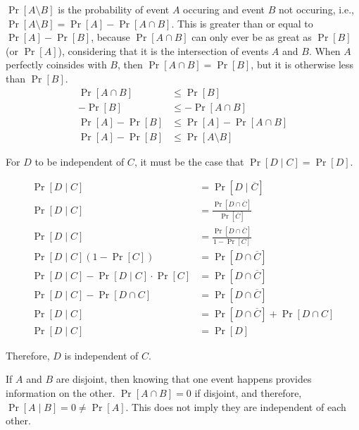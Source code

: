 \documentclass[11pt]{article}
\begin{document}
\begin{solution}

\begin{Parts}

\Part $\Pr[A \setminus B]$ is the probability of event $A$ occuring and event 
$B$ not occuring, i.e., $\Pr[A \setminus B] = \Pr[A] - \Pr[A \cap B]$. This is 
greater than or equal to $\Pr[A] - \Pr[B]$, because $\Pr[A \cap B]$ can
only ever be as great as $\Pr[B]$ (or $\Pr[A]$), considering that it is
the intersection of events $A$ and $B$. When $A$ perfectly coinsides with $B$, 
then $\Pr[A \cap B] = \Pr[B]$, but it is otherwise less than $\Pr[B]$.
\[
    \begin{split}
        \Pr[A \cap B] &\leq \Pr[B] \\
        -\Pr[B] &\leq -\Pr[A \cap B] \\
        \Pr[A] - \Pr[B] &\leq \Pr[A] -\Pr[A \cap B] \\
        \Pr[A] - \Pr[B] &\leq \Pr[A \setminus B] 
    \end{split}
\]

\Part For $D$ to be independent of $C$, it must be the case that $\Pr[D \mid C]
= \Pr[D]$. 

\[
    \begin{split}
        \Pr[D \mid C] &= \Pr[D \mid \overline{C}] \\
        \Pr[D \mid C] &= \frac{\Pr[D \cap \overline{C}]}{\Pr[\overline{C}]} \\
        \Pr[D \mid C] &= \frac{\Pr[D \cap \overline{C}]}{1-\Pr[C]} \\
        \Pr[D \mid C](1-\Pr[C]) &= \Pr[D \cap \overline{C}] \\
        \Pr[D \mid C]-\Pr[D \mid C] \cdot \Pr[C] &= \Pr[D \cap \overline{C}] \\
        \Pr[D \mid C]-\Pr[D \cap C] &= \Pr[D \cap \overline{C}] \\
        \Pr[D \mid C] &= \Pr[D \cap \overline{C}] + \Pr[D \cap C]\\
        \Pr[D \mid C] &= \Pr[D]
    \end{split}
\]

Therefore, $D$ is independent of $C$. 

\Part If $A$ and $B$ are disjoint, then knowing that one event happens provides
information on the other. $\Pr[A \cap B] = 0$ if disjoint, and therefore, 
$\Pr[A \mid B] = 0 \neq \Pr[A]$. This does not imply they are independent of 
each other. 

\end{Parts}

\end{solution}
\end{document}
